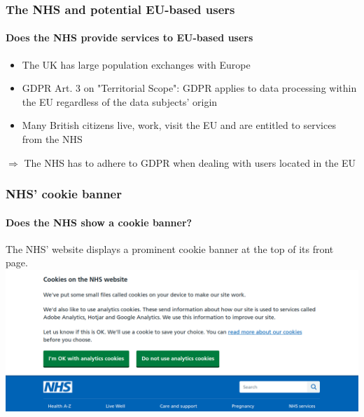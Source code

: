 \documentclass[aspectratio=43]{beamer}
\begin{document}
\begin{frame}
    \frametitle{The NHS and potential EU-based users}
    \framesubtitle{Does the NHS provide services to EU-based users}
    \begin{itemize}
        \item The UK has large population exchanges with Europe\newline
        \item  GDPR Art. 3 on "Territorial Scope": GDPR applies to data processing within the EU regardless of the data subjects' origin\newline
        \item Many British citizens live, work, visit the EU and are entitled to services from the NHS\newline
    \end{itemize}
    $\Rightarrow$ The NHS has to adhere to GDPR when dealing with users located in the EU
\end{frame}

\begin{frame}
    \frametitle{NHS' cookie banner}
    \framesubtitle{Does the NHS show a cookie banner?}
    The NHS' website displays a prominent cookie banner at the top of its front page.
    \newline
    \newline
    \includegraphics[width=0.9\linewidth]{imagens/nhs_cookie_bar.png}
\end{frame}
\end{document}
